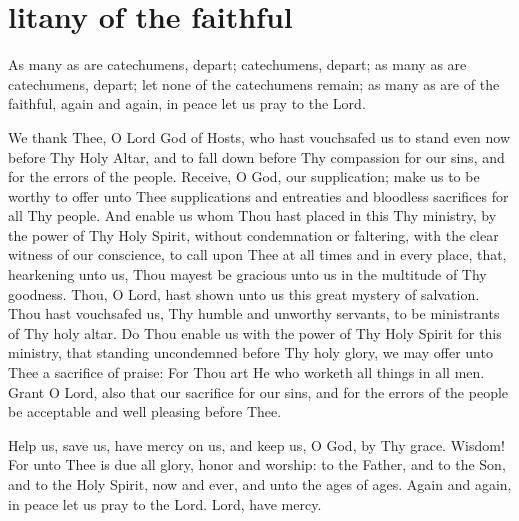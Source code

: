 \section{litany of the faithful}

\begin{liturgicaltext}
    \deacon As many as are catechumens, depart; catechumens, depart; as many as are catechumens, depart; let none of the catechumens remain; as many as are of the faithful, again and again, in peace let us pray to the Lord.
    \choirsemisecret {}
    \item[] 
\end{liturgicaltext}
\begin{semisecret}
    \begin{secretprayerbasil}
        We thank Thee, O Lord God of Hosts, who hast vouchsafed us to stand even now before Thy Holy Altar, and to fall down before Thy compassion for our sins, and for the errors of the people. Receive, O God, our supplication; make us to be worthy to offer unto Thee supplications and entreaties and bloodless sacrifices for all Thy people. And enable us whom Thou hast placed in this Thy ministry, by the power of Thy Holy Spirit, without condemnation or faltering, with the clear witness of our conscience, to call upon Thee at all times and in every place, that, hearkening unto us, Thou mayest be gracious unto us in the multitude of Thy goodness.
        \switchcolumn
        Thou, O Lord, hast shown unto us this great mystery of salvation. Thou hast vouchsafed us, Thy humble and unworthy servants, to be ministrants of Thy holy altar. Do Thou enable us with the power of Thy Holy Spirit for this ministry, that standing uncondemned before Thy holy glory, we may offer unto Thee a sacrifice of praise: For Thou art He who worketh all things in all men. Grant O Lord, also that our sacrifice for our sins, and for the errors of the people be acceptable and well pleasing before Thee.
    \end{secretprayerbasil}
\end{semisecret}
\begin{liturgicaltext}
    \deacon Help us, save us, have mercy on us, and keep us, O God, by Thy grace.
    \choir {}
    \deacon Wisdom!
    \priest For unto Thee is due all glory, honor and worship: to the Father, and to the Son, and to the Holy Spirit, now and ever, and unto the ages of ages.
    \choir {}
    \deacon Again and again, in peace let us pray to the Lord.
    \choirsemisecret Lord, have mercy. 
\end{liturgicaltext}
